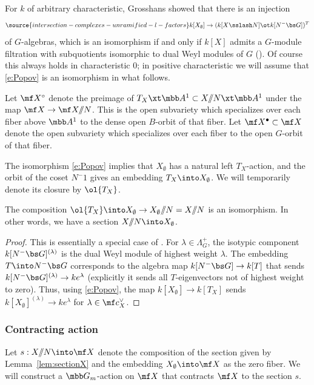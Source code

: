 For $k$ of arbitrary characteristic, Grosshans showed that
there is an injection
\begin{equation}\label{e:Popov}
\source{intersection-complexes-unramified-l-factors}
    k[X_\emptyset] \to (k[X\sslash N] \ot k[N^-\bs G])^T
\end{equation}
of $G$-algebras, which is an isomorphism
if and only if $k[X]$ admits a $G$-module filtration with subquotients
isomorphic to dual Weyl modules of $G$ (\cite[Theorems 8, 16]{Grosshans92}).
Of course this always holds in characteristic $0$; in positive characteristic
we will assume that \eqref{e:Popov} is an isomorphism in what follows.

Let $\mf X^\circ$ denote the preimage of $T_X \xt \mbb A^1 \subset X/\!\!/N \xt \mbb A^1$
under the map $\mf X \to \mf X/\!\!/N$. This is the
open subvariety which specializes
over each fiber above $\mbb A^1$ to the dense open $B$-orbit of
that fiber.
Let $\mf X^\bullet \subset \mf X$ denote the open subvariety which specializes
over each fiber to the open $G$-orbit of that fiber.



The isomorphism \eqref{e:Popov} implies that $X_\emptyset$ has a natural left $T_X$-action,
and the orbit of the coset $N^- 1$ gives an embedding
$T_X \into X_\emptyset$.
We will temporarily denote its closure by $\ol{T_X}$.
\begin{lem}
\notready  \label{lem:sectionX}
The composition $\ol{T_X} \into X_\emptyset \to X_\emptyset/\!\!/N = X/\!\!/N$ is an
isomorphism. In other words, we have a section
$X/\!\!/N \into X_\emptyset$.
\end{lem}
\begin{proof}
This is essentially a special case of \cite[Proposition 7]{AT}.
For $\lambda \in \Lambda_G^+$, the
isotypic component $k[N^-\bs G]^{(\lambda)}$ is the dual Weyl module
of highest weight $\lambda$. The embedding $T \into N^-\bs G$
corresponds to the algebra map
$k[N^-\bs G] \to k[T]$ that sends $k[N^-\bs G]^{(\lambda)} \to k e^\lambda$ (explicitly it sends all $T$-eigenvectors not of highest weight to zero).
Thus, using \eqref{e:Popov}, the map $k[X_\emptyset]\to k[T_X]$
sends $k[X_\emptyset]^{(\lambda)} \to k e^\lambda$ for $\lambda \in \mf c_X^\vee$.
\end{proof}

\subsubsection{Contracting action}
Let $s : X/\!\!/N\into \mf X$
denote the composition of the section given by Lemma~\ref{lem:sectionX} and the embedding
$X_\emptyset \into \mf X$ as the zero fiber.
We will construct a $\mbb G_m$-action on $\mf X$ that
contracts $\mf X$ to the section $s$.

